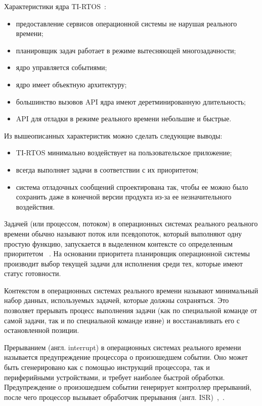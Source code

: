 Характеристики ядра TI-RTOS~\cite{ma_tirtos_kernel}:
\begin{itemize}
    \item предоставление сервисов операционной системы не нарушая реального времени;
    \item планировщик задач работает в режиме вытесняющей многозадачности;
    \item ядро управляется событиями;
    \item ядро имеет объектную архитектуру;
    \item большинство вызовов API ядра имеют деретминированную длительность;
    \item API для отладки в режиме реального времени небольшие и быстрые.
\end{itemize}

Из вышеописанных характеристик можно сделать следующие выводы:
\begin{itemize}
    \item TI-RTOS минимально воздействует на пользовательское приложение;
    \item всегда выполняет задачи в соответствии с их приоритетом;
    \item система отладочных сообщений спроектирована так, чтобы ее можно было
        сохранить даже в конечной версии продукта из-за ее незначительного воздействия.
\end{itemize}

Задачей (или процессом, потоком) в операционных системах реального реального времени
обычно называют поток или псевдопоток, который выполняют одну
простую функцию, запускается в выделенном контексте со определенным приоритетом
~\cite{ma_tirtos_kernel}.
На основании приоритета планировщик операционной системы производит выбор текущей
задачи для исполнения среди тех, которые имеют статус готовности.

Контекстом в операционных системах реального времени называют минимальный набор
данных, используемых задачей, которые должны сохраняться. Это позволяет прерывать
процесс выполнения задачи (как по специальной команде от самой задачи,
так и по специальной команде извне) и восстанавливать его
с остановленной позиции.%

Прерыванием (англ. interrupt) в операционных системах реального времени
называется предупреждение процессора о произошедшем событии. Оно может быть
сгенерировано как с помощью инструкций процессора, так и периферийными устройствами,
 и требует наиболее быстрой обработки.
Предупреждение о произошедшем событии генерирует контроллер прерываний,
после чего процессор вызывает обработчик прерывания
(англ. ISR)~\cite{rtos_valvano},~\cite{ma_tirtos_kernel}.

